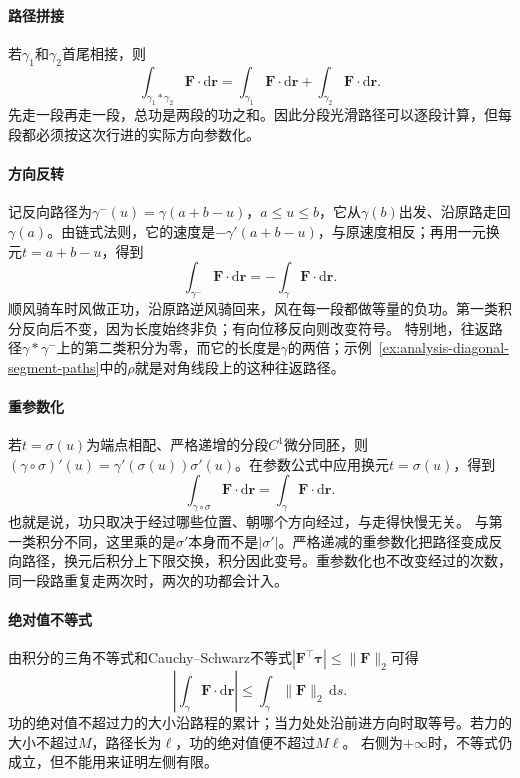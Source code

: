 \paragraph{路径拼接}

若$\gamma_1$和$\gamma_2$首尾相接，则
\[
 \int_{\gamma_1*\gamma_2}\bm F\cdot\mathrm d\bm r
 =\int_{\gamma_1}\bm F\cdot\mathrm d\bm r
 +\int_{\gamma_2}\bm F\cdot\mathrm d\bm r.
\]
先走一段再走一段，总功是两段的功之和。因此分段光滑路径可以逐段计算，但每段都必须按这次行进的实际方向参数化。

\paragraph{方向反转}

记反向路径为$\gamma^{-}(u)=\gamma(a+b-u)$，$a\leq u\leq b$，它从$\gamma(b)$出发、沿原路走回$\gamma(a)$。由链式法则，它的速度是$-\gamma'(a+b-u)$，与原速度相反；再用一元换元$t=a+b-u$，得到
\[
 \int_{\gamma^{-}}\bm F\cdot\mathrm d\bm r
 =-\int_\gamma\bm F\cdot\mathrm d\bm r.
\]
顺风骑车时风做正功，沿原路逆风骑回来，风在每一段都做等量的负功。第一类积分反向后不变，因为长度始终非负；有向位移反向则改变符号。
特别地，往返路径$\gamma*\gamma^{-}$上的第二类积分为零，而它的长度是$\gamma$的两倍；示例~\ref{ex:analysis-diagonal-segment-paths}中的$\rho$就是对角线段上的这种往返路径。

\paragraph{重参数化}

若$t=\sigma(u)$为端点相配、严格递增的分段$C^1$微分同胚，则
$(\gamma\circ\sigma)'(u)=\gamma'(\sigma(u))\sigma'(u)$。在参数公式中应用换元$t=\sigma(u)$，得到
\[
 \int_{\gamma\circ\sigma}\bm F\cdot\mathrm d\bm r
 =\int_\gamma\bm F\cdot\mathrm d\bm r.
\]
也就是说，功只取决于经过哪些位置、朝哪个方向经过，与走得快慢无关。
与第一类积分不同，这里乘的是$\sigma'$本身而不是$|\sigma'|$。严格递减的重参数化把路径变成反向路径，换元后积分上下限交换，积分因此变号。重参数化也不改变经过的次数，同一段路重复走两次时，两次的功都会计入。

\paragraph{绝对值不等式}

由积分的三角不等式和Cauchy--Schwarz不等式$|\bm F^\top\bm\tau|\leq\lVert\bm F\rVert_2$可得
\[
 \left|\int_\gamma\bm F\cdot\mathrm d\bm r\right|
 \leq\int_\gamma\lVert\bm F\rVert_2\,\mathrm ds.
\]
功的绝对值不超过力的大小沿路程的累计；当力处处沿前进方向时取等号。若力的大小不超过$M$，路径长为$\ell$，功的绝对值便不超过$M\ell$。
右侧为$+\infty$时，不等式仍成立，但不能用来证明左侧有限。

